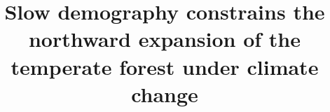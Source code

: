 \usepackage[margin=1in]{geometry}

\usepackage[T1]{fontenc}
\usepackage[utf8]{inputenc}

\usepackage{amsmath} %
\usepackage{amssymb}
\usepackage{amsthm}

\usepackage{setspace}
\usepackage[square,sort,comma,numbers]{natbib}


\onehalfspace

\usepackage{microtype}
\usepackage{lipsum}

\usepackage{caption}
\usepackage{subcaption}

\setlength{\columnsep}{1cm}

\usepackage{titling} %
\pretitle{\begin{flushleft}\Large}
\posttitle{\end{flushleft}}
\predate{}
\postdate{}
\preauthor{\begin{flushleft}}
\postauthor{\end{flushleft}}
\setlength{\droptitle}{-3em}

\setlength{\parskip}{0.5em}

\usepackage{authblk} %
\renewcommand\Authsep{\protect\\}
\renewcommand\Authands{\protect\\}

\usepackage{graphicx}
\captionsetup{labelformat=simple} %
\usepackage{booktabs}
\usepackage[flushleft]{threeparttable}
\usepackage{geometry}

\usepackage{tikz}
\usepackage{pgfplots}
\usepackage{pgfplotstable}
\usepackage{xcolor}
\usepackage{graphicx}
\usetikzlibrary{shapes, arrows, positioning}

\usepackage[bitstream-charter]{mathdesign}


%
%


\title{Slow demography constrains the northward expansion of the temperate forest under climate change}


